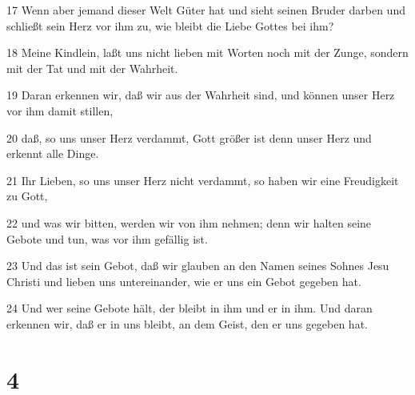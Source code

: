 \par 17 Wenn aber jemand dieser Welt Güter hat und sieht seinen Bruder darben und schließt sein Herz vor ihm zu, wie bleibt die Liebe Gottes bei ihm?
\par 18 Meine Kindlein, laßt uns nicht lieben mit Worten noch mit der Zunge, sondern mit der Tat und mit der Wahrheit.
\par 19 Daran erkennen wir, daß wir aus der Wahrheit sind, und können unser Herz vor ihm damit stillen,
\par 20 daß, so uns unser Herz verdammt, Gott größer ist denn unser Herz und erkennt alle Dinge.
\par 21 Ihr Lieben, so uns unser Herz nicht verdammt, so haben wir eine Freudigkeit zu Gott,
\par 22 und was wir bitten, werden wir von ihm nehmen; denn wir halten seine Gebote und tun, was vor ihm gefällig ist.
\par 23 Und das ist sein Gebot, daß wir glauben an den Namen seines Sohnes Jesu Christi und lieben uns untereinander, wie er uns ein Gebot gegeben hat.
\par 24 Und wer seine Gebote hält, der bleibt in ihm und er in ihm. Und daran erkennen wir, daß er in uns bleibt, an dem Geist, den er uns gegeben hat.

\chapter{4}

